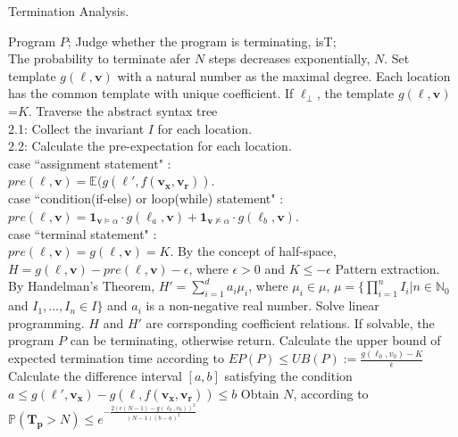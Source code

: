\documentclass[runningheads]{llncs}
\begin{document}
\begin{algorithm}[htb]  
	\caption{Termination Analysis.}  
	\label{TA}  
	\begin{algorithmic}[1]  
		\REQUIRE 
		Program $P$; 
		\ENSURE  
		Judge whether the program is terminating, isT;\\
		The probability to terminate afer $N$ steps decreases exponentially, $N$.
		\STATE Set template $g(\ell,\boldsymbol{v})$ with a natural number as the maximal degree. Each location has the common template with unique coefficient. If $\ell_{\bot}$, the template $g(\ell,\boldsymbol{v})$=$K$.
		\STATE Traverse the abstract syntax tree \\
		2.1: Collect the invariant $I$ for each location.\\
		2.2: Calculate the pre-expectation for each location.\\
		\quad \quad case ``assignment statement" :\\
		\quad \quad \quad \quad $pre(\ell,\boldsymbol{v})= \mathbb{E}(g(\ell',f(\boldsymbol{v_x},\boldsymbol{v_r}))$.\\
		\quad \quad case ``condition(if-else) or loop(while) statement" :\\
		\quad \quad \quad \quad $pre(\ell,\boldsymbol{v})=\textbf{1}_{\boldsymbol{v}\vDash\alpha} \cdot g(\ell_a,\boldsymbol{v})+\textbf{1}_{\boldsymbol{v}\nvDash\alpha} \cdot g(\ell_b,\boldsymbol{v})$.\\
		\quad \quad case ``terminal statement" :\\
		\quad \quad \quad \quad $pre(\ell,\boldsymbol{v})=g(\ell,\boldsymbol{v})=K$.
		\STATE By the concept of half-space, $H=g(\ell,\boldsymbol{v})-pre(\ell,\boldsymbol{v})-\epsilon$, where $\epsilon >0$ and $K \leq -\epsilon$
		\STATE Pattern extraction. By Handelman's Theorem, $H'=\sum\limits_{i=1}^{d} a_i \mu_i$, where $\mu_i \in \mu$, $\mu=\{\prod\limits_{i=1}^{n} I_i | n\in\mathbb{N}_0$ and $ I_1,\dots,I_n \in I\}$ and $a_i$ is a non-negative real number.
		\STATE Solve linear programming. $H$ and $H'$ are corrsponding coefficient relations. If solvable, the program $P$ can be terminating, otherwise return.
		\STATE Calculate the upper bound of expected termination time according to $EP(P)\leq UB(P):=\frac{g(\ell_0,v_0)-K}{\epsilon}$
		\STATE Calculate the difference interval $[a,b]$ satisfying the condition $a\leq g(\ell',\boldsymbol{v_x})-g(\ell,f(\boldsymbol{v_x},\boldsymbol{v_r}))\leq b$
		\STATE Obtain $N$, according to $\mathbb{P}(\bm{T_p} > N) \leq e^{-\frac{2(\epsilon(N-1)-g(\ell_0,v_0))^2}{(N-1)(b-a)^2}}$
	\end{algorithmic}  
\end{algorithm} 
\end{document}
